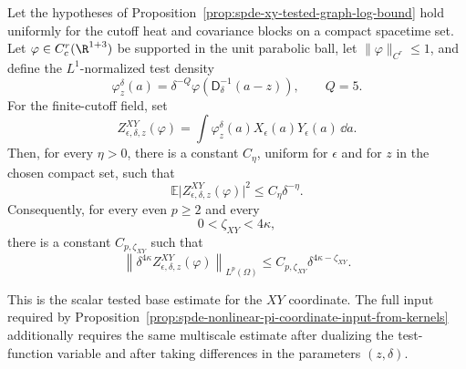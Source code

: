 \begin{proposition}
\label{prop:spde-xy-tested-coordinate-logarithmic-scale-bound}
Let the hypotheses of
Proposition~\ref{prop:spde-xy-tested-graph-log-bound} hold uniformly for the
cutoff heat and covariance blocks on a compact spacetime set.  Let
\(\varphi\in C_c^r(\R^{1+3})\) be supported in the unit parabolic ball, let
\(\|\varphi\|_{C^r}\leq1\), and define the \(L^1\)-normalized test density
\[
  \varphi_z^\delta(a)
  =
  \delta^{-Q}\varphi(\mathsf D_{\delta}^{-1}(a-z)),
  \qquad Q=5 .
\]
For the finite-cutoff field, set
\begin{equation}
  Z_{\epsilon,\delta,z}^{XY}(\varphi)
  =
  \int\varphi_z^\delta(a)X_\epsilon(a)Y_\epsilon(a)\,\dd a .
  \label{eq:spde-xy-tested-coordinate-random-variable}
\end{equation}
Then, for every \(\eta>0\), there is a constant \(C_\eta\), uniform for
\(\epsilon\) and for \(z\) in the chosen compact set, such that
\begin{equation}
  \mathbb E\bigl|Z_{\epsilon,\delta,z}^{XY}(\varphi)\bigr|^2
  \leq
  C_\eta\delta^{-\eta}.
  \label{eq:spde-xy-tested-coordinate-l2-log-loss}
\end{equation}
Consequently, for every even \(p\geq2\) and every
\[
  0<\zeta_{XY}<4\kappa ,
\]
there is a constant \(C_{p,\zeta_{XY}}\) such that
\begin{equation}
  \left\|
    \delta^{4\kappa}Z_{\epsilon,\delta,z}^{XY}(\varphi)
  \right\|_{L^p(\Omega)}
  \leq
  C_{p,\zeta_{XY}}\delta^{4\kappa-\zeta_{XY}} .
  \label{eq:spde-xy-tested-coordinate-normalized-slack}
\end{equation}

This is the scalar tested base estimate for the \(XY\) coordinate.  The full
input required by
Proposition~\ref{prop:spde-nonlinear-pi-coordinate-input-from-kernels}
additionally requires the same multiscale estimate after dualizing the
test-function variable and after taking differences in the parameters
\((z,\delta)\).
\end{proposition}

